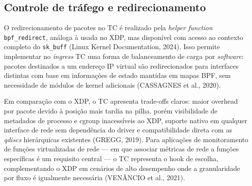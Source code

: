 \subsection*{Controle de tráfego e redirecionamento}

O redirecionamento de pacotes no TC é realizado pela \textit{helper function}
\texttt{bpf\_redirect}, análoga à usada no XDP, mas disponível com acesso ao contexto
completo do \texttt{sk\_buff} (Linux Kernel Documentation, 2024). Isso permite
implementar no \textit{ingress} TC uma forma de balanceamento de carga por
\textit{software}: pacotes destinados a um endereço IP virtual são redirecionados para
interfaces distintas com base em informações de estado mantidas em mapas BPF, sem
necessidade de módulos de kernel adicionais (CASSAGNES et al., 2020).

Em comparação com o XDP, o TC apresenta trade-offs claros: maior overhead por
pacote devido à posição mais tardia na pilha, porém visibilidade de metadados de processo
e cgroup inacessíveis ao XDP, suporte nativo em qualquer interface de rede sem
dependência do driver e compatibilidade direta com as \textit{qdiscs} hierárquicas
existentes (GREGG, 2019). Para aplicações de monitoramento de funções virtualizadas
de rede — em que associar métricas de rede a funções específicas é um requisito central
— o TC representa o hook de escolha, complementando o XDP em cenários de alto
desempenho onde a granularidade por fluxo é igualmente necessária (VENÂNCIO et al.,
2021).